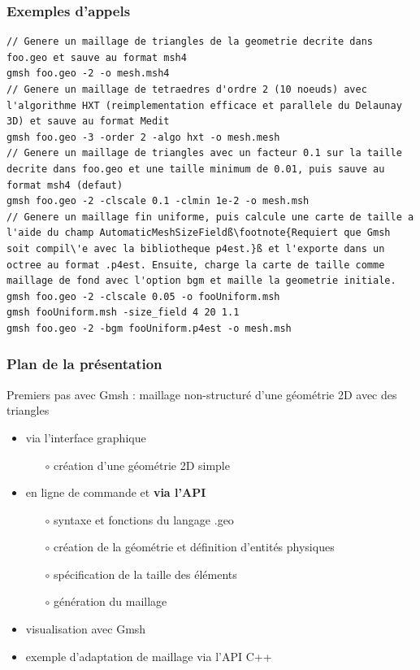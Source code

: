\documentclass[aspectratio=169]{beamer}
\begin{document}
\begin{frame}[fragile]
\frametitle{Exemples d'appels}
\begin{lstlisting}[frame=none, aboveskip=1mm, belowskip=2mm, escapechar=ß]
// Genere un maillage de triangles de la geometrie decrite dans foo.geo et sauve au format msh4
gmsh foo.geo -2 -o mesh.msh4
// Genere un maillage de tetraedres d'ordre 2 (10 noeuds) avec l'algorithme HXT (reimplementation efficace et parallele du Delaunay 3D) et sauve au format Medit
gmsh foo.geo -3 -order 2 -algo hxt -o mesh.mesh
// Genere un maillage de triangles avec un facteur 0.1 sur la taille decrite dans foo.geo et une taille minimum de 0.01, puis sauve au format msh4 (defaut)
gmsh foo.geo -2 -clscale 0.1 -clmin 1e-2 -o mesh.msh
// Genere un maillage fin uniforme, puis calcule une carte de taille a l'aide du champ AutomaticMeshSizeFieldß\footnote{Requiert que Gmsh soit compil\'e avec la bibliotheque p4est.}ß et l'exporte dans un octree au format .p4est. Ensuite, charge la carte de taille comme maillage de fond avec l'option bgm et maille la geometrie initiale.
gmsh foo.geo -2 -clscale 0.05 -o fooUniform.msh
gmsh fooUniform.msh -size_field 4 20 1.1
gmsh foo.geo -2 -bgm fooUniform.p4est -o mesh.msh
\end{lstlisting}
\end{frame}

\begin{frame}[fragile]
\frametitle{Plan de la présentation}
Premiers pas avec Gmsh : maillage non-structuré d'une géométrie 2D avec des triangles
\begin{itemize}
  \item via l'interface graphique
  \begin{itemize}
    \item[$\circ$] création d'une géométrie 2D simple
  \end{itemize}
  \item en ligne de commande et \textbf{via l'API}
  \begin{itemize}
    \item[$\circ$] syntaxe et fonctions du langage .geo
    \item[$\circ$] création de la géométrie et définition d'entités physiques
    \item[$\circ$] spécification de la taille des éléments
    \item[$\circ$] génération du maillage
  \end{itemize}
  \item visualisation avec Gmsh
  \item exemple d'adaptation de maillage via l'API C++
\end{itemize}
\end{frame}
\end{document}
